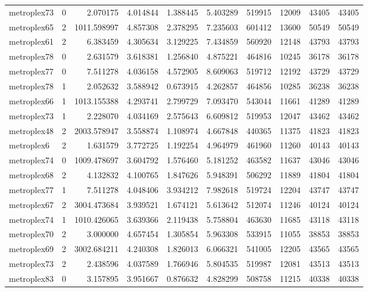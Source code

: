\begin{longtable}{|l|r|r|r|r|r|r|r|r|r|}
metroplex73 & 0 & 2.070175 & 4.014844 & 1.388445 & 5.403289 & 519915 & 12009 & 43405 & 43405 \\
metroplex65 & 2 & 1011.598997 & 4.857308 & 2.378295 & 7.235603 & 601412 & 13600 & 50549 & 50549 \\
metroplex61 & 2 & 6.383459 & 4.305634 & 3.129225 & 7.434859 & 560920 & 12148 & 43793 & 43793 \\
metroplex78 & 0 & 2.631579 & 3.618381 & 1.256840 & 4.875221 & 464816 & 10245 & 36178 & 36178 \\
metroplex77 & 0 & 7.511278 & 4.036158 & 4.572905 & 8.609063 & 519712 & 12192 & 43729 & 43729 \\
metroplex78 & 1 & 2.052632 & 3.588942 & 0.673915 & 4.262857 & 464856 & 10285 & 36238 & 36238 \\
metroplex66 & 1 & 1013.155388 & 4.293741 & 2.799729 & 7.093470 & 543044 & 11661 & 41289 & 41289 \\
metroplex73 & 1 & 2.228070 & 4.034169 & 2.575643 & 6.609812 & 519953 & 12047 & 43462 & 43462 \\
metroplex48 & 2 & 2003.578947 & 3.558874 & 1.108974 & 4.667848 & 440365 & 11375 & 41823 & 41823 \\
metroplex6 & 2 & 1.631579 & 3.772725 & 1.192254 & 4.964979 & 461960 & 11260 & 40143 & 40143 \\
metroplex74 & 0 & 1009.478697 & 3.604792 & 1.576460 & 5.181252 & 463582 & 11637 & 43046 & 43046 \\
metroplex68 & 2 & 4.132832 & 4.100765 & 1.847626 & 5.948391 & 506292 & 11889 & 41804 & 41804 \\
metroplex77 & 1 & 7.511278 & 4.048406 & 3.934212 & 7.982618 & 519724 & 12204 & 43747 & 43747 \\
metroplex67 & 2 & 3004.473684 & 3.939521 & 1.674121 & 5.613642 & 512074 & 11246 & 40124 & 40124 \\
metroplex74 & 1 & 1010.426065 & 3.639366 & 2.119438 & 5.758804 & 463630 & 11685 & 43118 & 43118 \\
metroplex70 & 2 & 3.000000 & 4.657454 & 1.305854 & 5.963308 & 533915 & 11055 & 38853 & 38853 \\
metroplex69 & 2 & 3002.684211 & 4.240308 & 1.826013 & 6.066321 & 541005 & 12205 & 43565 & 43565 \\
metroplex73 & 2 & 2.438596 & 4.037589 & 1.766946 & 5.804535 & 519987 & 12081 & 43513 & 43513 \\
metroplex83 & 0 & 3.157895 & 3.951667 & 0.876632 & 4.828299 & 508758 & 11215 & 40338 & 40338 \\

\end{longtable}
